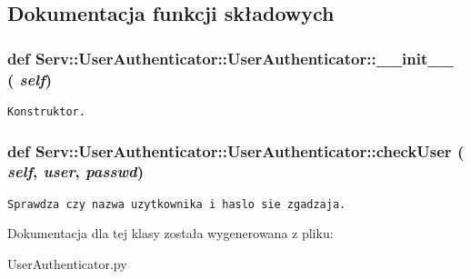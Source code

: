 \subsection{Dokumentacja funkcji składowych}
\hypertarget{class_serv_1_1_user_authenticator_1_1_user_authenticator_8da26a197368b560fc5b51a56cf95ccf}{
\subsubsection[{\_\-\_\-init\_\-\_\-}]{\setlength{\rightskip}{0pt plus 5cm}def Serv::UserAuthenticator::UserAuthenticator::\_\-\_\-init\_\-\_\- ( {\em self})}}
\label{class_serv_1_1_user_authenticator_1_1_user_authenticator_8da26a197368b560fc5b51a56cf95ccf}




\footnotesize\begin{verbatim}Konstruktor.\end{verbatim}
\normalsize
 \hypertarget{class_serv_1_1_user_authenticator_1_1_user_authenticator_df35019818eb86047a9c8d1d415bf3e5}{
\subsubsection[{checkUser}]{\setlength{\rightskip}{0pt plus 5cm}def Serv::UserAuthenticator::UserAuthenticator::checkUser ( {\em self}, \/   {\em user}, \/   {\em passwd})}}
\label{class_serv_1_1_user_authenticator_1_1_user_authenticator_df35019818eb86047a9c8d1d415bf3e5}




\footnotesize\begin{verbatim}Sprawdza czy nazwa uzytkownika i haslo sie zgadzaja.\end{verbatim}
\normalsize
 

Dokumentacja dla tej klasy została wygenerowana z pliku:\begin{CompactItemize}
\item 
UserAuthenticator.py\end{CompactItemize}
